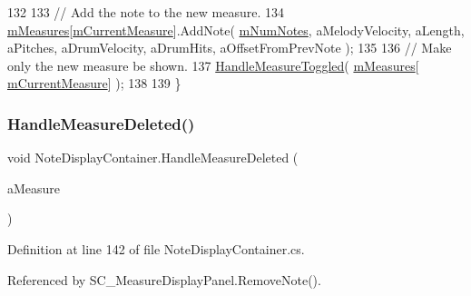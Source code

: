 \begin{DoxyCode}
132 
133         \textcolor{comment}{// Add the note to the new measure.}
134         \hyperlink{class_note_display_container_ae5ca6e7ea4ab2baaab9ff649bf25c0d6}{mMeasures}[\hyperlink{class_note_display_container_a79a97c9e0f45ba4242b66d6ec317d020}{mCurrentMeasure}].AddNote( \hyperlink{class_note_display_container_a31be4fc67033a1dcb210819e0e90d7e6}{mNumNotes}, aMelodyVelocity, 
      aLength, aPitches, aDrumVelocity, aDrumHits, aOffsetFromPrevNote );
135 
136         \textcolor{comment}{// Make only the new measure be shown.}
137         \hyperlink{class_note_display_container_a54dc5bb2f6850037473ec82efe632716}{HandleMeasureToggled}( \hyperlink{class_note_display_container_ae5ca6e7ea4ab2baaab9ff649bf25c0d6}{mMeasures}[
      \hyperlink{class_note_display_container_a79a97c9e0f45ba4242b66d6ec317d020}{mCurrentMeasure}] );
138 
139     \}
\end{DoxyCode}
\mbox{\label{class_note_display_container_a77cacb7c234490ae5ddb1f3979ecf9bc}} 
\subsubsection{\texorpdfstring{Handle\+Measure\+Deleted()}{HandleMeasureDeleted()}}
{\footnotesize\ttfamily void Note\+Display\+Container.\+Handle\+Measure\+Deleted (\begin{DoxyParamCaption}\item[{\hyperlink{class_s_c___measure_display_panel}{S\+C\+\_\+\+Measure\+Display\+Panel}}]{a\+Measure }\end{DoxyParamCaption})}



Definition at line 142 of file Note\+Display\+Container.\+cs.



Referenced by S\+C\+\_\+\+Measure\+Display\+Panel.\+Remove\+Note().


